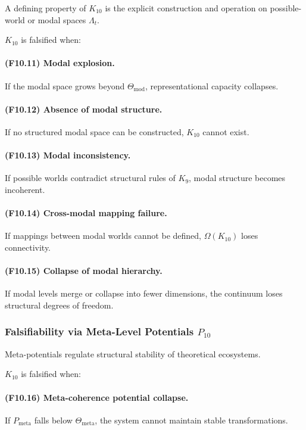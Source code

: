 A defining property of $K_{10}$ is the explicit construction and operation
on possible-world or modal spaces $\Lambda_t$.

$K_{10}$ is falsified when:

\paragraph{(F10.11) Modal explosion.}
If the modal space grows beyond $\Theta_{\mathrm{mod}}$,
representational capacity collapses.

\paragraph{(F10.12) Absence of modal structure.}
If no structured modal space can be constructed,
$K_{10}$ cannot exist.

\paragraph{(F10.13) Modal inconsistency.}
If possible worlds contradict structural rules of $K_9$,
modal structure becomes incoherent.

\paragraph{(F10.14) Cross-modal mapping failure.}
If mappings between modal worlds cannot be defined,
$\Omega(K_{10})$ loses connectivity.

\paragraph{(F10.15) Collapse of modal hierarchy.}
If modal levels merge or collapse into fewer dimensions,
the continuum loses structural degrees of freedom.



\subsubsection{Falsifiability via Meta-Level Potentials $P_{10}$}

Meta-potentials regulate structural stability of theoretical ecosystems.

$K_{10}$ is falsified when:

\paragraph{(F10.16) Meta-coherence potential collapse.}
If $P_{\mathrm{meta}}$ falls below $\Theta_{\mathrm{meta}}$,
the system cannot maintain stable transformations.

